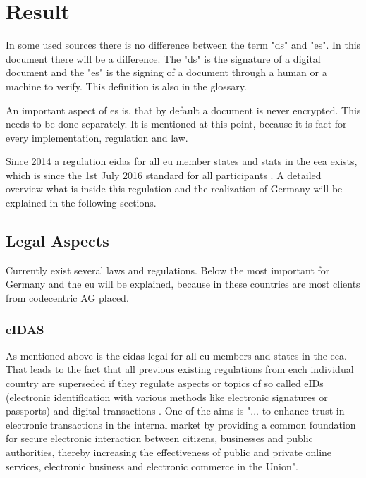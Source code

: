 \section{Result}

In some used sources there is no difference between the term "\gls{ds}" and "\gls{es}". In this document there will be a difference. The "\gls{ds}" is the signature of a digital document and the "\gls{es}" is the signing of a document through a human or a machine to verify. This definition is also in the glossary.

An important aspect of \gls{es} is, that by default a document is never encrypted. This needs to be done separately. It is mentioned at this point, because it is fact for every implementation, regulation and law. 

Since 2014 a regulation \gls{eidas} for all \gls{eu} member states and stats in the \gls{eea} \parencite{BundesministeriumInneren2018} exists, which is since the 1st July 2016 standard for all participants \parencite{Steffens2018eIDAS}. A detailed overview what is inside this regulation and the realization of Germany will be explained in the following sections. 

\subsection{Legal Aspects}
Currently exist several laws and regulations. Below the most important for Germany and the \gls{eu} will be explained, because in these countries are most clients from codecentric AG placed.

\subsubsection{eIDAS}
As mentioned above is the \gls{eidas} legal for all \gls{eu} members and states in the \gls{eea}. That leads to the fact that all previous existing regulations from each individual country are superseded if they regulate aspects or topics of so called eIDs (electronic identification with various methods like electronic signatures or passports) and digital transactions \parencite{Steffens2018eIDAS,SignEasy2018}. One of the aims is "... to  enhance  trust  in  electronic  transactions  in  the  internal  market  by  providing  a  common foundation  for  secure  electronic  interaction  between  citizens,  businesses  and  public  authorities,  thereby  increasing the  effectiveness  of  public  and  private  online  services,  electronic  business  and  electronic  commerce  in  the  Union"\parencite[p. 73 §2]{eIDAS2014}.

